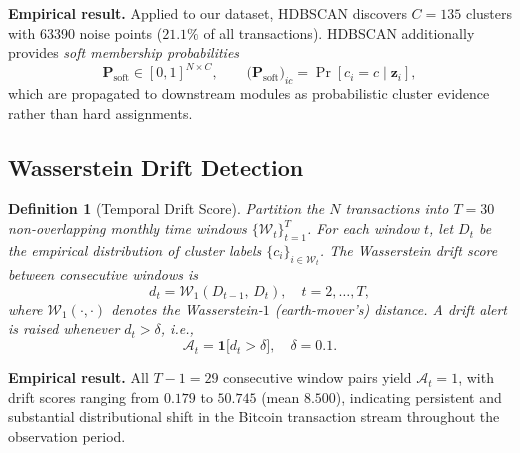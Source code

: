 \documentclass[journal]{IEEEtran}
\newtheorem{definition}{Definition}
\begin{document}
\noindent\textbf{Empirical result.}
Applied to our dataset, HDBSCAN discovers $C = 135$ clusters with
\num{63390} noise points ($21.1\%$ of all transactions).
HDBSCAN additionally provides \emph{soft membership probabilities}
\begin{equation}
  \mathbf{P}_{\mathrm{soft}}
    \in [0,1]^{N\times C},
  \qquad
  \bigl(\mathbf{P}_{\mathrm{soft}}\bigr)_{ic}
    = \Pr[c_{i} = c \mid \mathbf{z}_{i}],
  \label{eq:soft}
\end{equation}
which are propagated to downstream modules as probabilistic cluster
evidence rather than hard assignments.

\subsection{Wasserstein Drift Detection}
\label{subsec:wasserstein}

\begin{definition}[Temporal Drift Score]
\label{def:drift}
Partition the $N$ transactions into $T=30$ non-overlapping monthly time
windows $\{\mathcal{W}_{t}\}_{t=1}^{T}$.
For each window $t$, let $D_t$ be the empirical distribution of cluster
labels $\{c_{i}\}_{i\in\mathcal{W}_{t}}$.
The \emph{Wasserstein drift score} between consecutive windows is
\begin{equation}
  d_{t}
    = \mathcal{W}_{1}(D_{t-1},\, D_{t}),
  \quad t = 2,\ldots,T,
  \label{eq:wasserstein}
\end{equation}
where $\mathcal{W}_{1}(\cdot,\cdot)$ denotes the Wasserstein-$1$
(earth-mover's) distance.  A drift alert is raised whenever
$d_{t} > \delta$, i.e.,
\begin{equation}
  \mathcal{A}_{t} = \mathbf{1}\!\bigl[d_{t} > \delta\bigr],
  \quad \delta = 0.1.
  \label{eq:alert}
\end{equation}
\end{definition}

\noindent\textbf{Empirical result.}
All $T-1 = 29$ consecutive window pairs yield $\mathcal{A}_{t}=1$, with
drift scores ranging from $0.179$ to $50.745$ (mean $8.500$), indicating
persistent and substantial distributional shift in the Bitcoin transaction
stream throughout the observation period.

\end{document}
